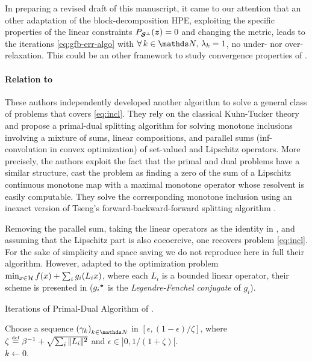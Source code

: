 In preparing a revised draft of this manuscript, it came to our attention that an other adaptation of the block-decomposition HPE, exploiting the specific properties of the linear constraints $P_{\boldsymbol {\mathcal{S}}^\bot}(\boldsymbol z) = 0$ and changing the metric, leads to the iterations \eqref{eq:gfb-err-algo} with $\foralls k \in \N, \, \la_k = 1$, \ie no under- nor over-relaxation. This could be an other framework to study convergence properties of \GFB.
 
\paragraph{Relation to \cite{CombettesPesquet11}}
These authors independently developed another algorithm to solve a general class of problems that covers \eqref{eq:incl}. They rely on the classical Kuhn-Tucker theory and propose a primal-dual splitting algorithm for solving monotone inclusions involving a mixture of sums, linear compositions, and parallel sums (inf-convolution in convex optimization) of set-valued and Lipschitz operators. More precisely, the authors exploit the fact that the primal and dual problems have a similar structure, cast the problem as finding a zero of the sum of a Lipschitz continuous monotone map with a maximal monotone operator whose resolvent is easily computable. They solve the corresponding monotone inclusion using an inexact version of Tseng's forward-backward-forward splitting algorithm \cite{Tseng00}.

Removing the parallel sum, taking the linear operators as the identity in \cite[(1.1)]{CombettesPesquet11}, and assuming that the Lipschitz part is also cocoercive, one recovers problem \eqref{eq:incl}. For the sake of simplicity and space saving we do not reproduce here in full their algorithm. However, adapted to the optimization problem $\min_{x\in\mathcal{H}} f(x)+\sum_i g_i(L_ix)$, where each $L_i$ is a bounded linear operator, their scheme is presented in  (${g_i}^{\boldsymbol*}$ is the \textit{Legendre-Fenchel conjugate} of $g_i$).

\begin{algorithm}[h]
\caption{Iterations of Primal-Dual Algorithm of \cite{CombettesPesquet11}.
\label{algo:CoPe}}
Choose a sequence $\pa{\ga_k}_{k \in \N}$ in $[\epsilon,(1-\epsilon)/\zeta]$, where $\zeta \stackrel{\mathrm{\scriptscriptstyle{def}}}{=} \beta^{-1} + \sqrt{\sum_i |\kern-1pt| L_i |\kern-1pt|^2}$ and $\epsilon \in ]0,1/(1+\zeta)[$.\\
$k \leftarrow 0$.\\
\end{algorithm}

